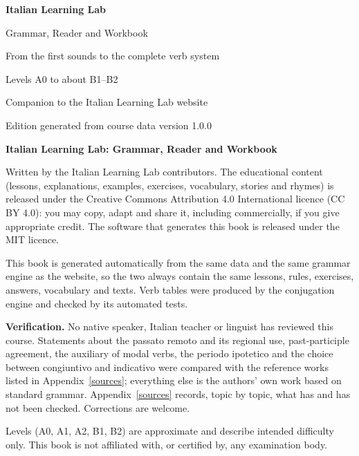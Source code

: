 \documentclass[11pt,a4paper,twoside,openright]{book}
\begin{document}
\frontmatter
\begin{titlepage}
\centering
\vspace*{30mm}
{\sffamily\bfseries\color{accent}\fontsize{40}{44}\selectfont Italian Learning Lab\par}
\vspace{10mm}
{\sffamily\LARGE Grammar, Reader and Workbook\par}
\vspace{6mm}
{\large From the first sounds to the complete verb system\par}
\vspace{4mm}
{\large\color{muted} Levels A0 to about B1--B2\par}
\vfill
{\large Companion to the Italian Learning Lab website\par}
\vspace{4mm}
{\color{muted}Edition generated from course data version 1.0.0\par}
\vspace{20mm}
\end{titlepage}

\thispagestyle{empty}
\vspace*{\fill}
{\small
\textbf{Italian Learning Lab: Grammar, Reader and Workbook}

Written by the Italian Learning Lab contributors. The educational content (lessons, explanations, examples, exercises, vocabulary, stories and rhymes) is released under the Creative Commons Attribution 4.0 International licence (CC BY 4.0): you may copy, adapt and share it, including commercially, if you give appropriate credit. The software that generates this book is released under the MIT licence.

This book is generated automatically from the same data and the same grammar engine as the website, so the two always contain the same lessons, rules, exercises, answers, vocabulary and texts. Verb tables were produced by the conjugation engine and checked by its automated tests.

\textbf{Verification.} No native speaker, Italian teacher or linguist has reviewed this course. Statements about the passato remoto and its regional use, past-participle agreement, the auxiliary of modal verbs, the periodo ipotetico and the choice between congiuntivo and indicativo were compared with the reference works listed in Appendix~\ref{sources}; everything else is the authors' own work based on standard grammar. Appendix~\ref{sources} records, topic by topic, what has and has not been checked. Corrections are welcome.

Levels (A0, A1, A2, B1, B2) are approximate and describe intended difficulty only. This book is not affiliated with, or certified by, any examination body.
}
\clearpage
\end{document}
